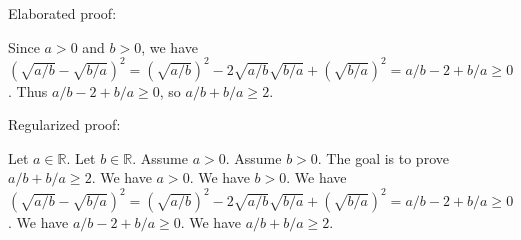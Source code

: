 \documentclass{article}
\begin{document}
Elaborated proof:
\begin{tcolorbox}[colback=green!10, width=\linewidth]
Since $a>0$ and $b>0$, we have $(\sqrt{a/b} - \sqrt{b/a})^2 = (\sqrt{a/b})^2 - 2\sqrt{a/b}\sqrt{b/a} + (\sqrt{b/a})^2 = a/b - 2 + b/a \ge 0$. Thus $a/b - 2 + b/a \ge 0$, so $a/b + b/a \ge 2$.
\end{tcolorbox}

Regularized proof:
\begin{tcolorbox}[colback=red!10, width=\linewidth]
Let $a\in\mathbb{R}$.
Let $b\in\mathbb{R}$.
Assume $a>0$.
Assume $b>0$.
The goal is to prove $a/b + b/a \ge 2$.
We have $a>0$.
We have $b>0$.
We have ${{(\sqrt{a/b} - \sqrt{b/a})}}^2 = {{(\sqrt{a/b})}}^2 - 2\sqrt{a/b}\sqrt{b/a} + {{(\sqrt{b/a})}}^2 = a/b - 2 + b/a \ge 0$.
We have $a/b - 2 + b/a \ge 0$.
We have $a/b + b/a \ge 2$.
\end{tcolorbox}
\end{document}
